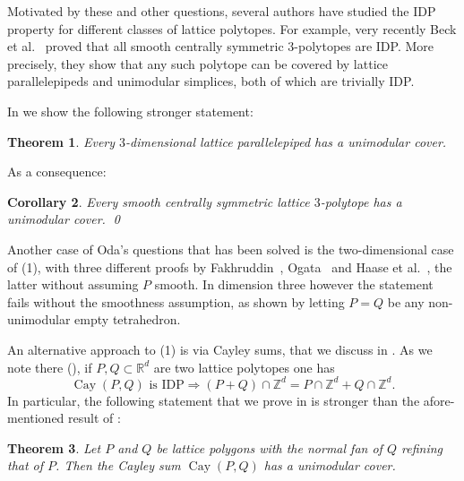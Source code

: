 \documentclass{amsart}
\theoremstyle{plain}
\newtheorem{theorem}{Theorem}[section]
\newtheorem{corollary}[theorem]{Corollary}
\theoremstyle{definition}
\newcommand{\Z}{ \ensuremath{\mathbb{Z}}}
\newcommand{\R}{ \ensuremath{\mathbb{R}}}
\newcommand{\cayley}{\operatorname{Cay}}
\begin{document}
Motivated by these and other questions, several authors have studied the IDP property for different classes of lattice polytopes. 
%
For example,  very recently
Beck et al.~\cite{BHHHJKM2019} proved that all smooth centrally symmetric $3$-polytopes are IDP.
More precisely, they show that any such polytope can be covered by lattice 
parallelepipeds and unimodular simplices, both of which are trivially IDP.

In  we show the following stronger statement:

\begin{theorem}
\label{thm:parallelepipeds}
Every $3$-dimensional lattice parallelepiped has a unimodular cover.
\end{theorem}

As a consequence:

\begin{corollary}
\label{coro:3cs}
Every smooth centrally symmetric lattice $3$-polytope has a unimodular cover. 
\qed
\end{corollary}



Another case of Oda's questions that has been solved is the two-dimensional case of (1), with three different proofs by
Fakhruddin~\cite{Fakhruddin}, Ogata~\cite{Ogata} and Haase et al.~\cite{HNPS2008}, the latter without assuming $P$ smooth. 
In dimension three however the statement fails without the smoothness assumption, as shown by letting $P=Q$ be any non-unimodular empty tetrahedron.

An alternative approach to (1) is via Cayley sums, that we discuss in  . 
As we note there (), if $P,Q\subset \R^d$ are two lattice polytopes one has
\[
\cayley(P,Q) \text{ is IDP} 
\Rightarrow
(P+Q) \cap \Z^d = P \cap \Z^d + Q \cap \Z^d.
\]
In particular, the following statement that we prove in  is stronger than the afore-mentioned result of \cite{Fakhruddin,HNPS2008,Ogata}:

\begin{theorem}
\label{thm:cayley}
Let $P$ and $Q$ be lattice polygons with the normal fan of $Q$ refining that of $P$. Then the Cayley sum $\cayley(P,Q)$ has a unimodular cover.
\end{theorem}
\end{document}
